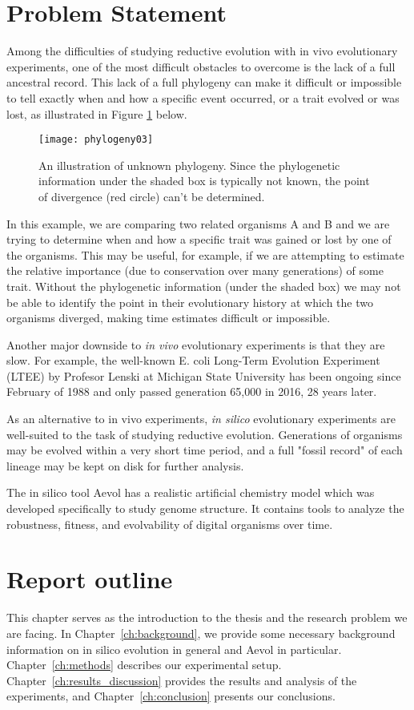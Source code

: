 \section{Problem Statement} \label{problem_statement}
Among the difficulties of studying reductive evolution with in vivo evolutionary experiments, one of the most difficult obstacles to overcome is the lack of a full ancestral record. This lack of a full phylogeny can make it difficult or impossible to tell exactly when and how a specific event occurred, or a trait evolved or was lost, as illustrated in Figure \ref{fig:phylogeny03} below. 
\begin{figure}[h]
\texttt{[image: phylogeny03]}
\centering
\caption[Unknown phylogeny]{An illustration of unknown phylogeny. Since the phylogenetic information under the shaded box is typically not known, the point of divergence (red circle) can't be determined.}
\label{fig:phylogeny03}
\end{figure}
In this example, we are comparing two related organisms A and B and we are trying to determine when and how a specific trait was gained or lost by one of the organisms. This may be useful, for example, if we are attempting to estimate the relative importance (due to conservation over many generations) of some trait. Without the phylogenetic information (under the shaded box) we may not be able to identify the point in their evolutionary history at which the two organisms diverged, making time estimates difficult or impossible.

Another major downside to \textit{in vivo} evolutionary experiments is that they are slow. For example, the well-known E. coli Long-Term Evolution Experiment (LTEE) by Profesor Lenski at Michigan State University has been ongoing since February of 1988 and only passed generation 65,000 in 2016, 28 years later. 

As an alternative to in vivo experiments, \textit{in silico} evolutionary experiments are well-suited to the task of studying reductive evolution. Generations of organisms may be evolved within a very short time period, and a full "fossil record" of each lineage may be kept on disk for further analysis. 

The in silico tool Aevol has a realistic artificial chemistry model which was developed specifically to study genome structure. It contains tools to analyze the robustness, fitness, and evolvability of digital organisms over time.  

\section{Report outline}
This chapter serves as the introduction to the thesis and the research problem we are facing. In Chapter~\ref{ch:background}, we provide some necessary background information on in silico evolution in general and Aevol in particular. Chapter~\ref{ch:methods} describes our experimental setup. Chapter~\ref{ch:results_discussion}
provides the results and analysis of the experiments, and Chapter~\ref{ch:conclusion} presents our conclusions. 


